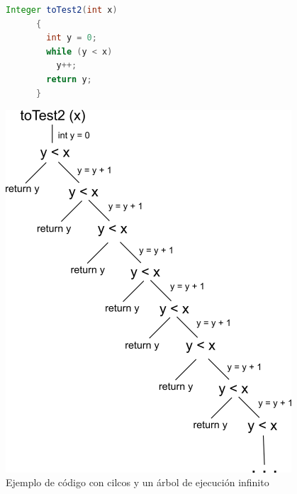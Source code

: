 \documentclass{llncs}
\begin{document}
\begin{figure}[hbt!]
   \centering
    \begin{minipage}[H]{0.5\textwidth}
      \begin{lstlisting}[language=Java]
	Integer toTest2(int x)
	  {
	    int y = 0;
	    while (y < x)
	      y++;
	    return y;
	  }
      \end{lstlisting}
    \end{minipage}
  \begin{minipage}[H]{0.45\textwidth}
    \centering
    \includegraphics[width=0.95\textwidth]{cicloInf}
  \end{minipage}
  \caption{Ejemplo de código con cilcos y un árbol de ejecución infinito}
  \label{cicloInf}
\end{figure}
\end{document}
